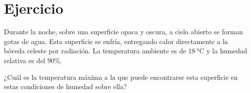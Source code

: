 \section{Ejercicio}\label{ej:Chap12Ejercicio05}
Durante la noche, sobre una superficie opaca y oscura, a cielo abierto se forman gotas de agua. Esta superficie se enfría, entregando calor directamente a la bóveda celeste por radiación. La temperatura ambiente es de $\SI{18}{\celsius}$ y la humedad relativa es del $90\%$.

¿Cuál es la temperatura máxima a la que puede encontrarse esta superficie en estas condiciones de humedad sobre ella?